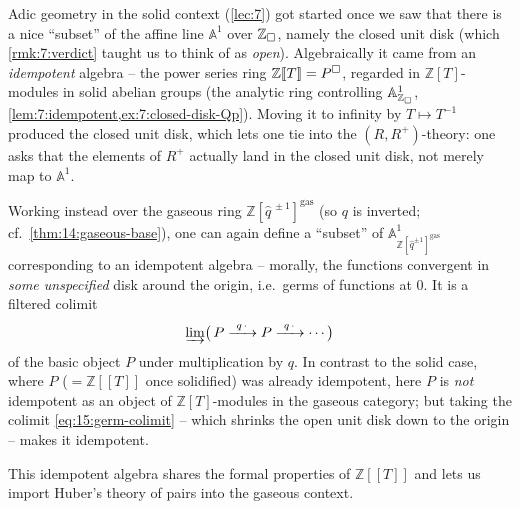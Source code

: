 \begin{remark}
\label{rmk:15:recall-solid-disk}
Adic geometry in the solid context (\cref{lec:7}) got started once we saw that there
is a nice ``subset'' of the affine line $\mathbb{A}^1$ over $\mathbb{Z}_{\square}$, namely the
closed unit disk (which \cref{rmk:7:verdict} taught us to think of as \emph{open}).
Algebraically it came from an \emph{idempotent} algebra -- the power series ring
$\mathbb{Z}[\![T]\!] = P^{\square}$, regarded in $\mathbb{Z}[T]$-modules in solid
abelian groups (the analytic ring controlling $\mathbb{A}^1_{\mathbb{Z}_{\square}}$,
\cref{lem:7:idempotent,ex:7:closed-disk-Qp}). Moving it to infinity by $T\mapsto
T^{-1}$ produced the closed unit disk, which lets one tie into the $(R,R^+)$-theory:
one asks that the elements of $R^+$ actually land in the closed unit disk, not merely
map to $\mathbb{A}^1$.
\end{remark}

\begin{remark}
\label{rmk:15:germs}
Working instead over the gaseous ring $\mathbb{Z}[\widehat{q}^{\,\pm1}]^{\mathrm{gas}}$
(so $q$ is inverted; cf.\ \cref{thm:14:gaseous-base}), one can again define a
``subset'' of $\mathbb{A}^1_{\mathbb{Z}[\widehat q^{\pm1}]^{\mathrm{gas}}}$
corresponding to an idempotent algebra -- morally, the functions convergent in
\emph{some unspecified} disk around the origin, i.e.\ germs of functions at $0$. It is
a filtered colimit
\begin{equation}
\label{eq:15:germ-colimit}
\varinjlim\bigl(\,P \xrightarrow{\ q\,\cdot\ } P \xrightarrow{\ q\,\cdot\ } \cdots\,\bigr)
\end{equation}
of the basic object $P$ under multiplication by $q$. In contrast to the solid case,
where $P$ ($=\mathbb{Z}[\![T]\!]$ once solidified) was already idempotent, here $P$ is
\emph{not} idempotent as an object of $\mathbb{Z}[T]$-modules in the gaseous category;
but taking the colimit \eqref{eq:15:germ-colimit} -- which shrinks the open unit disk
down to the origin -- makes it idempotent.
\end{remark}

This idempotent algebra shares the formal properties of $\mathbb{Z}[\![T]\!]$ and lets
us import Huber's theory of pairs into the gaseous context.

